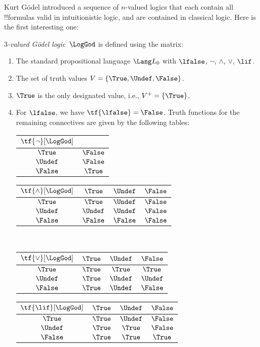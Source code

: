 \documentclass[../../../include/open-logic-section]{subfiles}
\begin{document}


Kurt G\"odel introduced a sequence of $n$-valued logics that each
contain all !!{formula}s valid in intuitionistic logic, and are
contained in classical logic.  Here is the first interesting one:

\begin{defn}
\emph{$3$-valued G\"odel logic}~$\LogGod$ is defined using the matrix:
\begin{enumerate}
  \item The standard propositional language $\Lang L_0$ with
  $\lfalse$, $\lnot$, $\land$, $\lor$, $\lif$.
  \item The set of truth values $V = \{\True, \Undef, \False\}$.
  \item $\True$ is the only designated value, i.e., $V^+ = \{\True\}$.
  \item For $\lfalse$, we have $\tf{\lfalse} = \False$. Truth
  functions for the remaining connectives are given by the following
  tables:
  \begin{center}
    \begin{tabular}{c|c} 
      $\tf{\lnot}[\LogGod]$ & \\ 
      \hline  
      $\True$ & $\False$ \\ 
      $\Undef$ & $\False$ \\
      $\False$ & $\True$ 
    \end{tabular}
    \quad
    \begin{tabular}{c|ccc} 
      $\tf{\land}[\LogGod]$ & $\True$ & $\Undef$ & $\False$ \\ 
      \hline 
      $\True$ & $\True$ & $\Undef$ & $\False$ \\ 
      $\Undef$ & $\Undef$ & $\Undef$ & $\False$\\ 
      $\False$ & $\False$ & $\False$ & $\False$ 
    \end{tabular}
    \\[2ex]
    \begin{tabular}{c|ccc} 
      $\tf{\lor}[\LogGod]$ & $\True$ & $\Undef$ & $\False$ \\ 
      \hline 
      $\True$ & $\True$ & $\True$ & $\True$ \\ 
      $\Undef$ & $\True$ & $\Undef$ & $\Undef$ \\
      $\False$ & $\True$ & $\Undef$ & $\False$ 
    \end{tabular}
    \quad
    \begin{tabular}{c|ccc} 
      $\tf{\lif}[\LogGod]$ & $\True$ & $\Undef$ & $\False$ \\ 
      \hline 
      $\True$ & $\True$ & $\Undef$ & $\False$ \\ 
      $\Undef$ & $\True$ & $\True$ & $\False$  \\ 
      $\False$ & $\True$ & $\True$ & $\True$ 
    \end{tabular}
  \end{center} 
\end{enumerate}
\end{defn}
\end{document}
